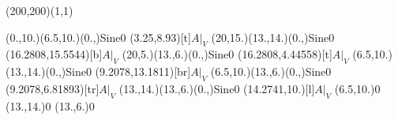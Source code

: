 \unitlength=1bp%

\begin{feynartspicture}(200,200)(1,1)

\FADiagram{}
\FAProp(0.,10.)(6.5,10.)(0.,){Sine}{0}
\FALabel(3.25,8.93)[t]{$A|_V$}
\FAProp(20,15.)(13.,14.)(0.,){Sine}{0}
\FALabel(16.2808,15.5544)[b]{$A|_V$}
\FAProp(20,5.)(13.,6.)(0.,){Sine}{0}
\FALabel(16.2808,4.44558)[t]{$A|_V$}
\FAProp(6.5,10.)(13.,14.)(0.,){Sine}{0}
\FALabel(9.2078,13.1811)[br]{$A|_V$}
\FAProp(6.5,10.)(13.,6.)(0.,){Sine}{0}
\FALabel(9.2078,6.81893)[tr]{$A|_V$}
\FAProp(13.,14.)(13.,6.)(0.,){Sine}{0}
\FALabel(14.2741,10.)[l]{$A|_V$}
\FAVert(6.5,10.){0}
\FAVert(13.,14.){0}
\FAVert(13.,6.){0}
\end{feynartspicture}

